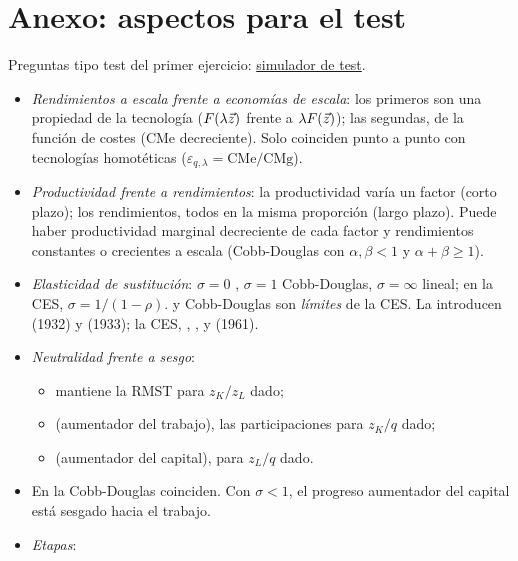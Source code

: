 \documentclass[11pt]{article}
\begin{document}
\section{Anexo: aspectos para el test}\label{anexo:test}

\begin{anotaciones}
Preguntas tipo test del primer ejercicio: \href{https://www.victorgutierrezmarcos.es/oposicion/temario/primer-ejercicio/test/simulador.html?tema=3.A.11}{simulador de test}.
\end{anotaciones}

\begin{itemize}
\item \emph{Rendimientos a escala frente a economías de escala}: los primeros son una propiedad de la tecnología ($F(\lambda\vec{z})$ frente a $\lambda F(\vec{z})$); las segundas, de la función de costes ($\mathrm{CMe}$ decreciente). Solo coinciden punto a punto con tecnologías homotéticas ($\varepsilon_{q,\lambda}=\mathrm{CMe}/\mathrm{CMg}$).
\item \emph{Productividad frente a rendimientos}: la productividad varía un factor (corto plazo); los rendimientos, todos en la misma proporción (largo plazo). Puede haber productividad marginal decreciente de cada factor y rendimientos constantes o crecientes a escala (Cobb-Douglas con $\alpha,\beta<1$ y $\alpha+\beta\geq 1$).
\item \emph{Elasticidad de sustitución}: $\sigma=0$ , $\sigma=1$ Cobb-Douglas, $\sigma=\infty$ lineal; en la CES, $\sigma=1/(1-\rho)$.  y Cobb-Douglas son \emph{límites} de la CES. La introducen  (1932) y  (1933); la CES, , ,  y  (1961).
\item \emph{Neutralidad frente a sesgo}:
  \begin{itemize}
  \item {} mantiene la RMST para $z_K/z_L$ dado;
  \item {} (aumentador del trabajo), las participaciones para $z_K/q$ dado;
  \item {} (aumentador del capital), para $z_L/q$ dado.
  \end{itemize}
\item En la Cobb-Douglas coinciden. Con $\sigma<1$, el progreso aumentador del capital está sesgado hacia el trabajo.
\item \emph{Etapas}:

\end{itemize}
\end{document}
